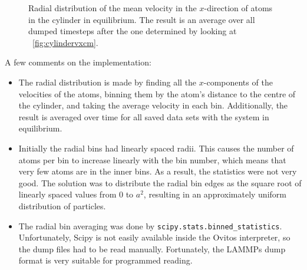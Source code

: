 \documentclass[11pt,british,a4paper]{report}
\begin{document}
\begin{figure}[tbh]
    \centering
    \caption{Radial distribution of the mean velocity in the \(x\)-direction of atoms in the cylinder in equilibrium. The result is an average over all dumped timesteps after the one determined by looking at ~\vref{fig:cylindervxcm}.}%
    \label{fig:cylindervx}
\end{figure}
A few comments on the implementation:
\begin{itemize}
    \item The radial distribution is made by finding all the \(x\)-components of the velocities of the atoms, binning them by the atom's distance to the centre of the cylinder, and taking the average velocity in each bin. Additionally, the result is averaged over time for all saved data sets with the system in equilibrium.
    \item Initially the radial bins had linearly spaced radii. This causes the number of atoms per bin to increase linearly with the bin number, which means that very few atoms are in the inner bins. As a result, the statistics were not very good. The solution was to distribute the radial bin edges as the square root of linearly spaced values from \(0\) to \(a^2\), resulting in an approximately uniform distribution of particles.
    \item The radial bin averaging was done by \texttt{scipy.stats.binned\_statistics}. Unfortunately, Scipy is not easily available inside the Ovitos interpreter, so the dump files had to be read manually. Fortunately, the LAMMPs dump format is very suitable for programmed reading.
\end{itemize}
\end{document}
